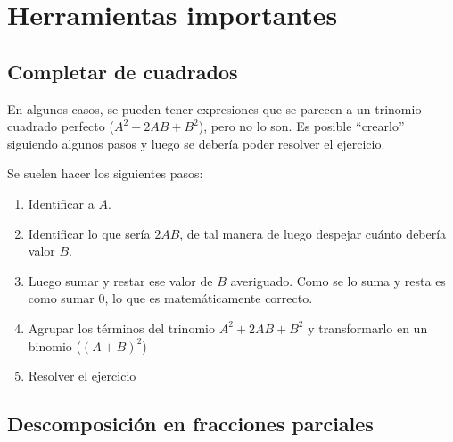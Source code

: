 \section{Herramientas importantes}

\subsection{Completar de cuadrados}

En algunos casos, se pueden tener expresiones que se parecen a un trinomio cuadrado perfecto ($A^2 + 2AB + B^2$), pero no lo son. Es posible ``crearlo'' siguiendo algunos pasos y luego se debería poder resolver el ejercicio.

Se suelen hacer los siguientes pasos:
\begin{enumerate}
    \item Identificar a $A$.
    \item Identificar lo que sería $2AB$, de tal manera de luego despejar cuánto debería valor $B$.
    \item Luego sumar y restar ese valor de $B$ averiguado. Como se lo suma y resta es como sumar $0$, lo que es matemáticamente correcto.
    \item Agrupar los términos del trinomio $A^2 + 2AB + B^2$ y transformarlo en un binomio ($(A+B)^2$)
    \item Resolver el ejercicio
\end{enumerate}

\subsection{Descomposición en fracciones parciales}
